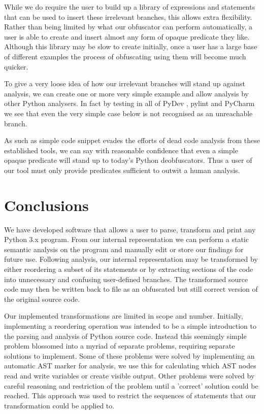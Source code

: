 \documentclass[twoside,a4paper]{report}
\begin{document}
While we do require the user to build up a library of expressions and statements that can be used to insert these irrelevant branches, this allows extra
flexibility. Rather than being limited by what our obfuscator can perform automatically, a user is able to create and insert almost any form of opaque
predicate they like. Although this library may be slow to create initially, once a user has a large base of different examples the process of obfuscating using
them will become much quicker.

To give a very loose idea of how our irrelevant branches will stand up against analysis, we can create one or more very simple example and allow analysis by
other Python analysers. In fact by testing in all of PyDev \cite{pydev}, pylint \cite{pylint} and PyCharm \cite{pycharm} we see that even the very
simple case below is not recognised as an unreachable branch.



As such as simple code snippet evades the efforts of dead code analysis from these established tools, we can say with reasonable confidence that even a
simple opaque predicate will stand up to today's Python deobfuscators. Thus a user of our tool must only provide predicates sufficient to outwit a human
analysis.

\section{Conclusions}

We have developed software that allows a user to parse, transform and print any Python 3.x program. From our internal representation we can perform a static
semantic analysis on the program and manually edit or store our findings for future use. Following analysis, our internal representation may be transformed
by either reordering a subset of its statements or by extracting sections of the code into unnecessary and confusing user-defined branches. The transformed
source code may then be written back to file as an obfuscated but still correct version of the original source code.

Our implemented transformations are limited in scope and number. Initially, implementing a reordering operation was intended to be a simple introduction
to the parsing and analysis of Python source code. Instead this seemingly simple problem blossomed into a myriad of separate problems, requiring separate
solutions to implement. Some of these problems were solved by implementing an automatic AST marker for analysis, we use this for calculating which AST nodes
read and write variables or create visible output. Other problems were solved by careful reasoning and restriction of the problem until a 'correct' solution
could be reached. This approach was used to restrict the sequences of statements that our transformation could be applied to.
\end{document}
